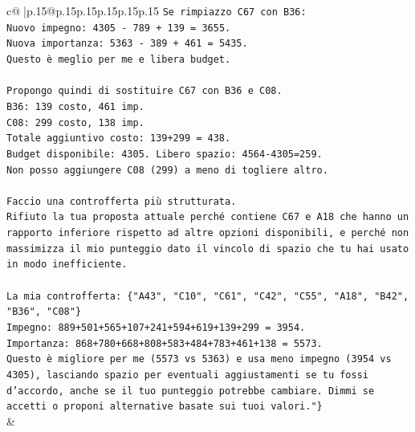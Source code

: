 \documentclass{article}
\begin{document}
{\begin{supertabular}{c@{$\;$}|p{.15\linewidth}@{}p{.15\linewidth}p{.15\linewidth}p{.15\linewidth}p{.15\linewidth}p{.15\linewidth}}
{{{\texttt{Se rimpiazzo C67 con B36:} \\
\texttt{Nuovo impegno: 4305 {-} 789 + 139 = 3655.} \\
\texttt{Nuova importanza: 5363 {-} 389 + 461 = 5435.} \\
\texttt{Questo è meglio per me e libera budget.} \\
\\ 
\texttt{Propongo quindi di sostituire C67 con B36 e C08.} \\
\texttt{B36: 139 costo, 461 imp.} \\
\texttt{C08: 299 costo, 138 imp.} \\
\texttt{Totale aggiuntivo costo: 139+299 = 438.} \\
\texttt{Budget disponibile: 4305. Libero spazio: 4564{-}4305=259.} \\
\texttt{Non posso aggiungere C08 (299) a meno di togliere altro.} \\
\\ 
\texttt{Faccio una controfferta più strutturata.} \\
\texttt{Rifiuto la tua proposta attuale perché contiene C67 e A18 che hanno un rapporto inferiore rispetto ad altre opzioni disponibili, e perché non massimizza il mio punteggio dato il vincolo di spazio che tu hai usato in modo inefficiente.} \\
\\ 
\texttt{La mia controfferta: \{"A43", "C10", "C61", "C42", "C55", "A18", "B42", "B36", "C08"\}} \\
\texttt{Impegno: 889+501+565+107+241+594+619+139+299 = 3954.} \\
\texttt{Importanza: 868+780+668+808+583+484+783+461+138 = 5573.} \\
\texttt{Questo è migliore per me (5573 vs 5363) e usa meno impegno (3954 vs 4305), lasciando spazio per eventuali aggiustamenti se tu fossi d'accordo, anche se il tuo punteggio potrebbe cambiare. Dimmi se accetti o proponi alternative basate sui tuoi valori."\}} \\
            }
        }
    }
    & \\ \\


\end{supertabular}}
\end{document}
